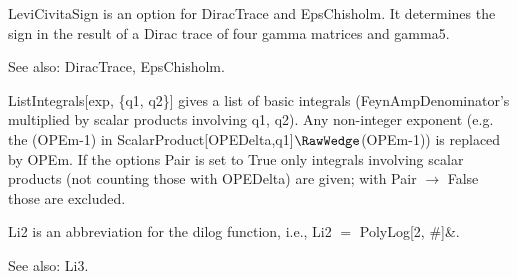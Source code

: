 







LeviCivitaSign is an option for DiracTrace and EpsChisholm. It determines the sign in the result of a Dirac trace of four gamma matrices
  and gamma5.

See also:  DiracTrace, EpsChisholm.



ListIntegrals[exp, \{q1, q2\}] gives a list of basic integrals { }(FeynAmpDenominator's multiplied by scalar products involving q1, q2).
  { }Any non-integer exponent (e.g. the (OPEm-1) in { }ScalarProduct[OPEDelta,q1]\(\RawWedge\)(OPEm-1)) is replaced by OPEm. { }If the
  options Pair is set to True only integrals involving { } scalar products (not counting those with OPEDelta) are given; with Pair
  \(\rightarrow \) False those are excluded.





 Li2 is an abbreviation for the dilog function, i.e., Li2 \(=\) PolyLog[2, \#{}]\&{}.

See also: Li3.




